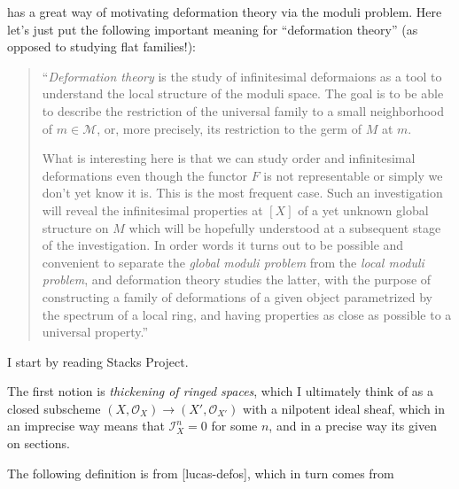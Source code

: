 \noindent
\cite{Sernesi-Overview} has a great way of motivating deformation
theory via the moduli problem.
Here let's just put the following important meaning for
``deformation theory'' (as opposed to studying flat families!):

\begin{quote}
``{\it Deformation theory} is the study of infinitesimal deformaions
as a tool to understand the local structure of the moduli space.
The goal is to be able to describe the restriction
of the universal family to a small neighborhood of $m \in \mathcal{M}$,
or, more precisely, its restriction to the germ of $M$ at $m$.

What is interesting here is that we can study order and infinitesimal
deformations even though the functor $F$ is not representable or simply we don’t
yet know it is. This is the most frequent case. Such an investigation will
reveal the infinitesimal properties at $[X]$ of a yet unknown global structure
on $M$ which will be hopefully understood at a subsequent stage of the
investigation.  In order words it turns out to be possible and convenient to
separate the {\it global moduli problem} from the {\it local moduli problem},
and deformation theory studies the latter, with the purpose of constructing a
family of deformations of a given object parametrized by the spectrum of a local
ring, and having properties as close as possible to a universal property.''
\end{quote}




\noindent
I start by reading Stacks Project.

\medskip\noindent
The first notion is {\it thickening of ringed spaces},
which I ultimately think of as a closed subscheme
$(X,\mathcal{O}_X) \to (X',\mathcal{O}_{X'})$
with a nilpotent ideal sheaf,
which in an imprecise way means
that $\mathcal{I}_X^n=0$ for some $n$,
and in a precise way its given on sections.

\medskip\noindent
The following definition is from [lucas-defos], which in turn comes from
\cite{Sernesi-deformations}


